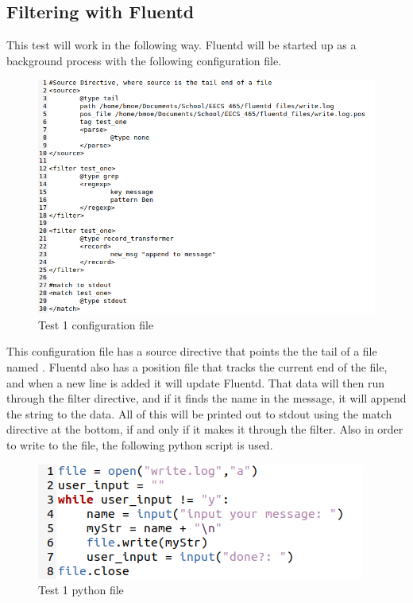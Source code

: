 \documentclass{article}
\begin{document}
\subsection{Filtering with Fluentd}
\quad \quad This test will work in the following way. Fluentd will be started up as a background process with the following configuration file.
\begin{figure}[H]
    \centering
    \includegraphics[scale=0.6]{images/t1_1.png}
    \caption{Test 1 configuration file}
    \label{fig:pic3}
\end{figure}
This configuration file has a source directive that points the the tail of a file named . Fluentd also has a position file that tracks the current end of the file, and when a new line is added it will update Fluentd.
That data will then run through the filter directive, and if it finds the name  in the message, it will append the string  to the data. All of this will be printed out to stdout using 
the match directive at the bottom, if and only if it makes it through the filter. Also in order to write to the file, the following python script is used.
\begin{figure}[H]
    \centering
    \includegraphics[scale=1]{images/t1_2.png}
    \caption{Test 1 python file}
    \label{fig:pic4}
\end{figure}
\end{document}
